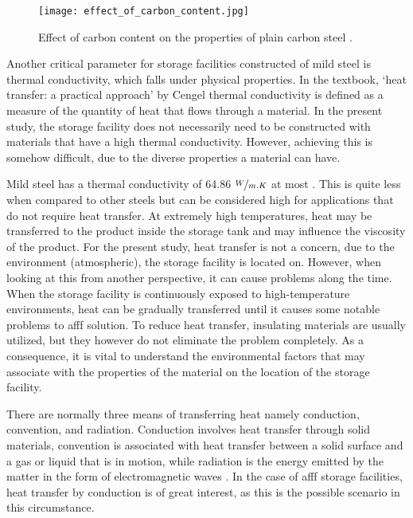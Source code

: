 \begin{figure}[H]
    \centering
    \texttt{[image: effect\_of\_carbon\_content.jpg]}
    \caption{Effect of carbon content on the properties of plain carbon steel \cite{timings2008fabrication}.}
    \label{ch3:figure:carbon}
\end{figure}

Another critical parameter for storage facilities constructed of mild steel is thermal conductivity, which falls under physical properties. In the textbook, ‘heat transfer: a practical approach’ by Cengel \cite{cengel1998heat} thermal conductivity is defined as a measure of the quantity of heat that flows through a material. In the present study, the storage facility does not necessarily need to be constructed with materials that have a high thermal conductivity. However, achieving this is somehow difficult, due to the diverse properties a material can have.

Mild steel has a thermal conductivity of 64.86 $\nicefrac{W}{m.K}$ at most \cite{cengel1998heat}. This is quite less when compared to other steels but can be considered high for applications that do not require heat transfer. At extremely high temperatures, heat may be transferred to the product inside the storage tank and may influence the viscosity of the product. For the present study, heat transfer is not a concern, due to the environment (atmospheric), the storage facility is located on. However, when looking at this from another perspective, it can cause problems along the time. When the storage facility is continuously exposed to high-temperature environments, heat can be gradually transferred until it causes some notable problems to \acrshort{afff} solution. To reduce heat transfer, insulating materials are usually utilized, but they however do not eliminate the problem completely. As a consequence, it is vital to understand the environmental factors that may associate with the properties of the material on the location of the storage facility.

There are normally three means of transferring heat namely conduction, convention, and radiation. Conduction involves heat transfer through solid materials, convention is associated with heat transfer between a solid surface and a gas or liquid that is in motion, while radiation is the energy emitted by the matter in the form of electromagnetic waves \cite{cengel1998heat}. In the case of \acrshort{afff} storage facilities, heat transfer by conduction is of great interest, as this is the possible scenario in this circumstance.   

